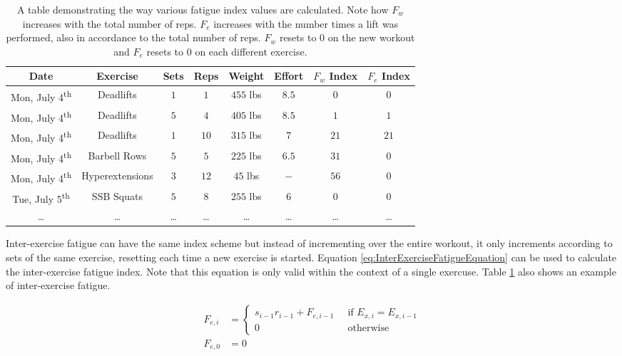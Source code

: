 \begin{table}[h]
	\centering
	\begin{tabular}{c|c|c|c|c|c|c|c}
		Date & Exercise & Sets & Reps & Weight & Effort & $F_w$ Index & $F_e$ Index \\
        \hline
        Mon, July 4\textsuperscript{th} & Deadlifts & $1$ & $1$ & $455$ lbs & $8.5$ & $0$ & $0$ \\
        Mon, July 4\textsuperscript{th} & Deadlifts & $5$ & $4$ & $405$ lbs & $8.5$ & $1$ & $1$ \\
        Mon, July 4\textsuperscript{th} & Deadlifts & $1$ & $10$ & $315$ lbs & $7$ & $21$ & $21$ \\
        Mon, July 4\textsuperscript{th} & Barbell Rows & $5$ & $5$ & $225$ lbs & $6.5$ & $31$ & $0$ \\
        Mon, July 4\textsuperscript{th} & Hyperextensions & $3$ & $12$ & $45$ lbs & $-$ & $56$ & $0$ \\
        Tue, July 5\textsuperscript{th} & SSB Squats & $5$ & $8$ & $255$ lbs & $6$ & $0$ & $0$ \\
        \dots & \dots & \dots & \dots & \dots & \dots & \dots & \dots \\
	\end{tabular}
	\caption{A table demonstrating the way various fatigue index values are calculated. Note how $F_w$ increases with the total number of reps. $F_e$ increases with the number times a lift was performed, also in accordance to the total number of reps. $F_w$ resets to $0$ on the new workout and $F_e$ resets to $0$ on each different exercise.}
	\label{tab:IndexesExample}
\end{table}

Inter-exercise fatigue can have the same index scheme but instead of incrementing over the entire workout, it only increments according to sets of the same exercise, resetting each time a new exercise is started. Equation \ref{eq:InterExerciseFatigueEquation} can be used to calculate the inter-exercise fatigue index. Note that this equation is only valid within the context of a single exercuse. Table \ref{tab:IndexesExample} also shows an example of inter-exercise fatigue.

\begin{equation}
	\label{eq:InterExerciseFatigueEquation}
	\begin{split}
		F_{e,i} & =
		\begin{cases}
			s_{i-1}r_{i-1}+F_{e,i-1} \;\; & \text{if }E_{x,i}=E_{x,i-1} \\
			0 \;\; & \text{otherwise}
		\end{cases}
		\\
		F_{e,0} & = 0
	\end{split}
\end{equation}

